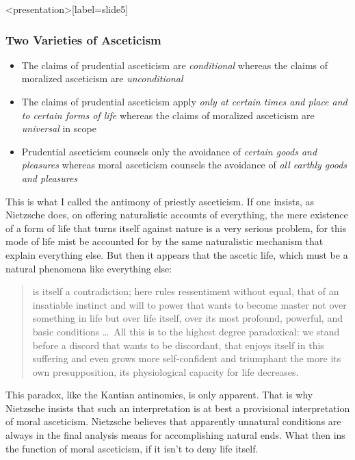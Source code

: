 \begin{frame}<presentation>[label=slide5]
    \frametitle{Two Varieties of Asceticism}
        \begin{itemize}
            \item The claims of prudential asceticism are \emph{conditional} whereas the claims of moralized asceticism are \emph{unconditional}
            \item The claims of prudential asceticism apply \emph{only at certain times and place and to certain forms of life} whereas the claims of moralized asceticism are \emph{universal} in scope
            \item Prudential asceticism counsels only the avoidance of \emph{certain goods and pleasures} whereas moral asceticism counsels the avoidance of \emph{all earthly goods and pleasures}
        \end{itemize}
\end{frame}

This is what I called the antimony of priestly asceticism. If one insists, as Nietzsche does, on offering naturalistic accounts of everything, the mere existence of a form of life that turns itself against nature is a very serious problem, for this mode of life mist be accounted for by the same naturalistic mechanism that explain everything else. But then it appears that the ascetic life, which must be a natural phenomena like everything else:
\begin{quote}
    is itself a contradiction; here rules ressentiment without equal, that of an insatiable instinct and will to power that wants to become master not over something in life but over life itself, over its most profound, powerful, and basic conditions \ldots\ All this is to the highest degree paradoxical: we stand before a discord that wants to be discordant, that enjoys itself in this suffering and even grows more self-confident and triumphant the more its own presupposition, its physiological capacity for life decreases.
\end{quote}
This paradox, like the Kantian antinomies, is only apparent. That is why Nietzsche insists that such an interpretation is at best a provisional interpretation of moral asceticism. Nietzsche believes that apparently unnatural conditions are always in the final analysis means for accomplishing natural ends. What then ins the function of moral asceticism, if it isn't to deny life itself.

